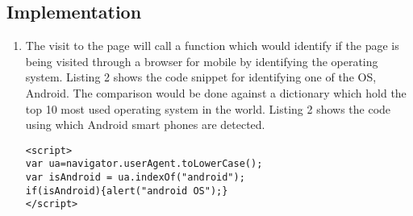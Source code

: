 \documentclass[journal]{IEEEtran}
\begin{document}
\subsection{Implementation}
\begin{enumerate}
  \item The visit to the page will call a function which would identify if the page is being visited through a browser for mobile by identifying the operating system. Listing 2 shows the code snippet for identifying one of the OS, Android. The comparison would be done against a dictionary which hold the top 10 most used operating system in the world. Listing 2 shows the code using which Android smart phones are detected.
  
\medskip
\begin{lstlisting}[]
<script>
var ua=navigator.userAgent.toLowerCase();
var isAndroid = ua.indexOf("android");
if(isAndroid){alert("android OS");}
</script>
\end{lstlisting}
\noindent{}\\
\begin{verbatim}


\end{verbatim}
\end{enumerate}
\end{document}
